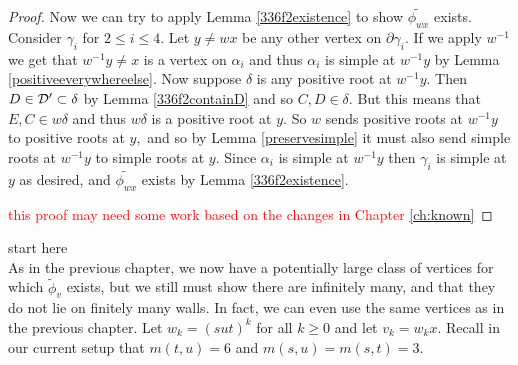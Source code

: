 \documentclass[class=book, crop=false]{standalone}
\begin{document}
\begin{proof}
Now we can try to apply Lemma \ref{336f2existence} to show $\tilde{\phi_{wx}}$ exists. Consider $\gamma_i$ for $2\le i\le 4.$ Let $y\neq wx$ be any other vertex on $\partial\gamma_i.$ If we apply $w^{-1}$ we get that $w^{-1}y\neq x$ is a vertex on $\alpha_i$ and thus $\alpha_i$ is simple at $w^{-1}y$ by Lemma \ref{positiveeverywhereelse}. Now suppose $\delta$ is any positive root at $w^{-1}y.$ Then $D\in \mathcal{D}'\subset \delta$ by Lemma \ref{336f2containD} and so $C,D\in \delta.$ But this means that $E,C\in w\delta$ and thus $w\delta$ is a positive root at $y.$ So $w$ sends positive roots at $w^{-1}y$ to positive roots at $y,$ and so by Lemma \ref{preservesimple} it must also send simple roots at $w^{-1}y$ to simple roots at $y.$ Since $\alpha_i$ is simple at $w^{-1}y$ then $\gamma_i$ is simple at $y$ as desired, and $\tilde{\phi_{wx}}$ exists by Lemma \ref{336f2existence}.

\textcolor{red}{this proof may need some work based on the changes in Chapter \ref{ch:known}}
\end{proof}
\Huge start here \normalsize\\

As in the previous chapter, we now have a potentially large class of vertices for which $\tilde{\phi}_v$ exists, but we still must show there are infinitely many, and that they do not lie on finitely many walls. In fact, we can even use the same vertices as in the previous chapter. Let $w_k=(sut)^k$ for all $k\ge 0$ and let $v_k=w_kx.$ Recall in our current setup that $m(t,u)=6$ and $m(s,u)=m(s,t)=3.$ 
\end{document}
